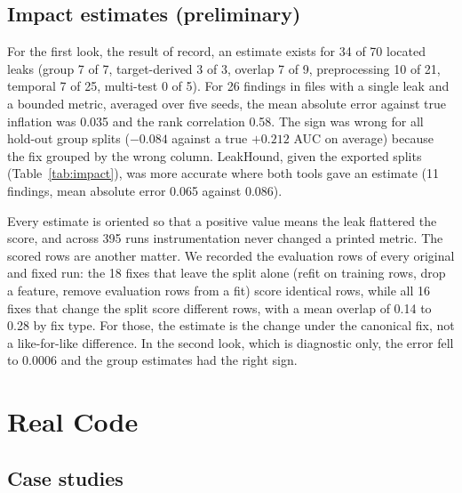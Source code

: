 \documentclass[conference]{IEEEtran}
\begin{document}
\subsection{Impact estimates (preliminary)}

For the first look, the result of record, an estimate exists for 34 of 70 located leaks (group 7 of 7,
target-derived 3 of 3, overlap 7 of 9, preprocessing 10 of 21, temporal 7 of 25, multi-test 0 of 5). For 26 findings in files with a single leak and a
bounded metric, averaged over five seeds, the mean absolute error against true inflation was
0.035 and the rank correlation 0.58. The sign was wrong for all hold-out group splits ($-0.084$ against a true
$+0.212$ AUC on average) because the fix grouped by the wrong column. LeakHound, given the exported splits
(Table~\ref{tab:impact}), was more accurate where both tools gave an estimate (11 findings, mean absolute error
0.065 against 0.086).

Every estimate is oriented so that a positive value means the leak
flattered the score, and across 395 runs instrumentation never changed a printed metric. The scored rows are
another matter. We recorded the evaluation rows of every original and
fixed run: the 18 fixes that leave the split alone (refit on training rows, drop a feature, remove evaluation rows
from a fit) score identical rows, while all 16 fixes that change the split score different rows, with a mean
overlap of 0.14 to 0.28 by fix type. For those, the estimate is the change under the canonical fix, not a
like-for-like difference. In the second look, which is diagnostic only, the error fell to 0.0006 and the group
estimates had the right sign.

\begin{table}[t]
\caption{Impact estimates against true inflation (TEST, single-leak files, seed 0). Comp.: pipelines reporting
AUC or $R^2$. Cells: estimates (mean absolute error). LH: LeakHound; col.: true column named.}
\label{tab:impact}
\footnotesize
\setlength{\tabcolsep}{2.4pt}

\end{table}

\section{Real Code}
\label{sec:real}

\subsection{Case studies}
\end{document}
